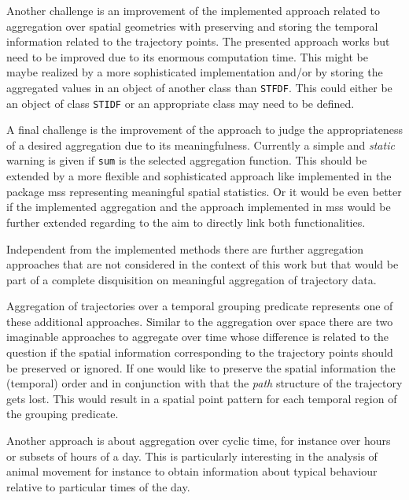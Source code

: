 \documentclass[12pt, oneside, a4paper]{scrbook}
\newcommand{\pkg}[1]{{\normalfont\fontseries{b}\selectfont #1}}
\let\code=\texttt
\begin{document}
Another challenge is an improvement of the implemented approach related to aggregation over spatial geometries with preserving and storing the temporal information related to the trajectory points. 
The presented approach works but need to be improved due to its enormous computation time. 
This might be maybe realized by a more sophisticated implementation and/or by storing the aggregated values in an object of another class than \code{STFDF}.
This could either be an object of class \code{STIDF} or an appropriate class may need to be defined.
\par\medskip

A final challenge is the improvement of the approach to judge the appropriateness of a desired aggregation due to its meaningfulness. Currently a simple and \textit{static} warning is given if \code{sum} is the selected aggregation function. This should be extended by a more flexible and sophisticated approach like implemented in the package \pkg{mss} representing meaningful spatial statistics. Or it would be even better if the implemented aggregation and the approach implemented in \pkg{mss} would be further extended regarding to the aim to directly link both functionalities.
\par\medskip

Independent from the implemented methods there are further aggregation approaches that are not considered in the context of this work but that would be part of a complete disquisition on meaningful aggregation of trajectory data.
\par\medskip

Aggregation of trajectories over a temporal grouping predicate represents one of these additional approaches.
Similar to the aggregation over space there are two imaginable approaches to aggregate over time whose difference is related to the question if the spatial information corresponding to the trajectory points should be preserved or ignored. 
If one would like to preserve the spatial information the (temporal) order and in conjunction with that the \textit{path} structure of the trajectory gets lost. This would result in a spatial point pattern for each temporal region of the grouping predicate.
\par\medskip

Another approach is about aggregation over cyclic time, for instance over hours or subsets of hours of a day. This is particularly interesting in the analysis of animal movement for instance to obtain information about typical behaviour relative to particular times of the day.
\par\medskip
\end{document}
